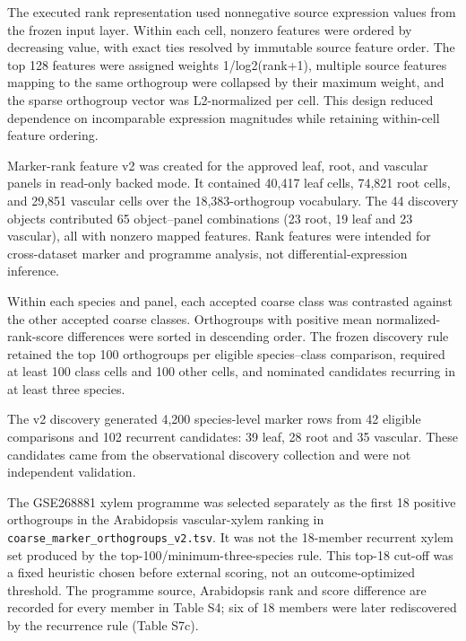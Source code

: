 
The executed rank representation used nonnegative source expression values from the frozen input layer. Within each cell, nonzero features were ordered by decreasing value, with exact ties resolved by immutable source feature order. The top 128 features were assigned weights 1/log2(rank+1), multiple source features mapping to the same orthogroup were collapsed by their maximum weight, and the sparse orthogroup vector was L2-normalized per cell. This design reduced dependence on incomparable expression magnitudes while retaining within-cell feature ordering.

Marker-rank feature v2 was created for the approved leaf, root, and vascular panels in read-only backed mode. It contained 40,417 leaf cells, 74,821 root cells, and 29,851 vascular cells over the 18,383-orthogroup vocabulary. The 44 discovery objects contributed 65 object--panel combinations (23 root, 19 leaf and 23 vascular), all with nonzero mapped features. Rank features were intended for cross-dataset marker and programme analysis, not differential-expression inference.


Within each species and panel, each accepted coarse class was contrasted against the other accepted coarse classes. Orthogroups with positive mean normalized-rank-score differences were sorted in descending order. The frozen discovery rule retained the top 100 orthogroups per eligible species--class comparison, required at least 100 class cells and 100 other cells, and nominated candidates recurring in at least three species.

The v2 discovery generated 4,200 species-level marker rows from 42 eligible comparisons and 102 recurrent candidates: 39 leaf, 28 root and 35 vascular. These candidates came from the observational discovery collection and were not independent validation.

The GSE268881 xylem programme was selected separately as the first 18 positive orthogroups in the Arabidopsis vascular-xylem ranking in \texttt{coarse\_marker\_orthogroups\_v2.tsv}. It was not the 18-member recurrent xylem set produced by the top-100/minimum-three-species rule. This top-18 cut-off was a fixed heuristic chosen before external scoring, not an outcome-optimized threshold. The programme source, Arabidopsis rank and score difference are recorded for every member in Table S4; six of 18 members were later rediscovered by the recurrence rule (Table S7c).

